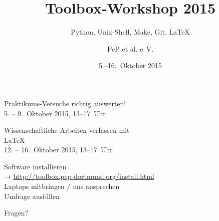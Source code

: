 

\title[Toolbox 2015]{Toolbox-Workshop 2015}
\subtitle{Python, Unix-Shell, Make, Git, \LaTeX{}}
\date{5.–16.~Oktober 2015}
\author{PeP et al. e.\,V.}



\maketitle

\begin{frame}
  \begin{center}
  \Large Praktikums-Versuche richtig auswerten!\\
  5. – 9.~Oktober 2015, 13–17~Uhr
  \end{center}
\end{frame}

\begin{frame}
  \begin{center}
    Wissenschaftliche Arbeiten verfassen mit \\[0.5\baselineskip]
    \textrm{\Huge\LaTeX{}}\\[0.5\baselineskip]
    12. – 16.~Oktober 2015, 13–17~Uhr
  \end{center}
\end{frame}

\begin{frame}
  \begin{center}
    \Large
    Software installieren\\[0.5\baselineskip]
    → \textcolor{blue!70!black}{\url{http://toolbox.pep-dortmund.org/install.html}}\\[0.5\baselineskip]
    Laptops mitbringen / uns ansprechen\\[0.5\baselineskip]
    Umfrage ausfüllen
  \end{center}
\end{frame}
\begin{frame}
  \Huge\centering
  \textcolor{red!70!black}{Fragen?}
\end{frame}


